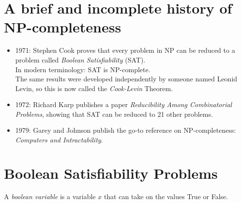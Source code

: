 \documentclass[11  pt]{article}
\begin{document}
	
	\section{A brief and incomplete history of NP-completeness}
	
	\begin{itemize}
		\item 1971: Stephen Cook proves that every problem in NP can be reduced to a problem called \emph{Boolean Satisfiability} (SAT).\\
		
		In modern terminology: SAT is NP-complete.\\
		
		The same results were developed independently by someone named Leonid Levin, so this is now called the \emph{Cook-Levin} Theorem. \\
		\item 1972: Richard Karp publishes a paper \emph{Reducibility Among Combinatorial Problems}, showing that SAT can be reduced to 21 other problems. \\
		
		
		\item 1979: Garey and Johnson publish the go-to reference on NP-completeness: \emph{Computers and Intractability}.
	\end{itemize}
	
	\section{Boolean Satisfiability Problems}
	A \emph{boolean variable} is a variable $x$ that can take on the values True or False. \\
	
\end{document}
